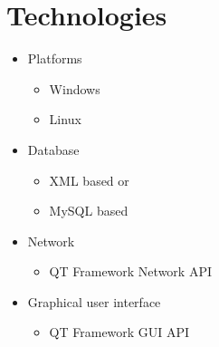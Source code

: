 \documentclass[a4paper,12pt,final]{article}
\begin{document}
\section{Technologies}

\begin{itemize}

\item{Platforms}
\begin{itemize}
\item{Windows}
\item{Linux}
\end{itemize}


\item{Database}
\begin{itemize}
\item{XML based or}
\item{MySQL based}
\end{itemize}


\item{Network}
\begin{itemize}
\item{QT Framework Network API}
\end{itemize}


\item{Graphical user interface}
\begin{itemize}
\item{QT Framework GUI API}
\end{itemize}

\end{itemize}
\end{document}
